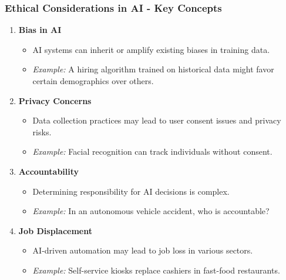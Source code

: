 \documentclass[aspectratio=169]{beamer}
\begin{document}
\begin{frame}[fragile]
    \frametitle{Ethical Considerations in AI - Key Concepts}
    \begin{enumerate}
        \item \textbf{Bias in AI}
        \begin{itemize}
            \item AI systems can inherit or amplify existing biases in training data.
            \item \textit{Example:} A hiring algorithm trained on historical data might favor certain demographics over others.
        \end{itemize}
        
        \item \textbf{Privacy Concerns}
        \begin{itemize}    
            \item Data collection practices may lead to user consent issues and privacy risks.
            \item \textit{Example:} Facial recognition can track individuals without consent.
        \end{itemize}
        
        \item \textbf{Accountability}
        \begin{itemize}
            \item Determining responsibility for AI decisions is complex.
            \item \textit{Example:} In an autonomous vehicle accident, who is accountable?
        \end{itemize}

        \item \textbf{Job Displacement}
        \begin{itemize}
            \item AI-driven automation may lead to job loss in various sectors.
            \item \textit{Example:} Self-service kiosks replace cashiers in fast-food restaurants.
        \end{itemize}
    \end{enumerate}
\end{frame}
\end{document}
